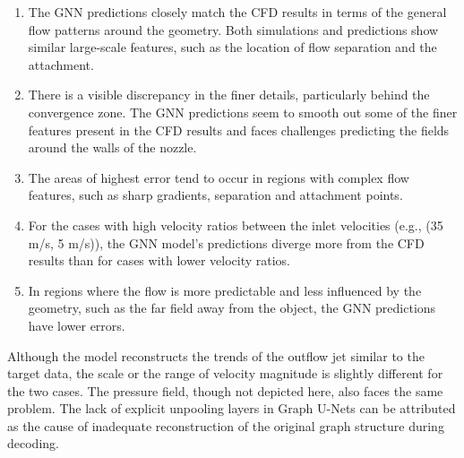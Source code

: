 \begin{enumerate}
\item The GNN predictions closely match the CFD results in terms of the general flow patterns around the geometry. Both simulations and predictions show similar large-scale features, such as the location of flow separation and the attachment.
\item There is a visible discrepancy in the finer details, particularly behind the convergence zone. The GNN predictions seem to smooth out some of the finer features present in the CFD results and faces challenges predicting the fields around the walls of the nozzle.  
\item The areas of highest error tend to occur in regions with complex flow features, such as sharp gradients, separation and attachment points.
\item For the cases with high velocity ratios between the inlet velocities (e.g., (35 m/s, 5 m/s)), the GNN model's predictions diverge more from the CFD results than for cases with lower velocity ratios. 
\item  In regions where the flow is more predictable and less influenced by the geometry, such as the far field away from the object, the GNN predictions have lower errors.
\end{enumerate}
Although the model reconstructs the trends of the outflow jet similar to the target data, the scale or the range of velocity magnitude is slightly different for the two cases. The pressure field, though not depicted here, also faces the same problem. The lack of explicit unpooling layers in Graph U-Nets can be attributed as the cause of inadequate reconstruction of the original graph structure during decoding. 
